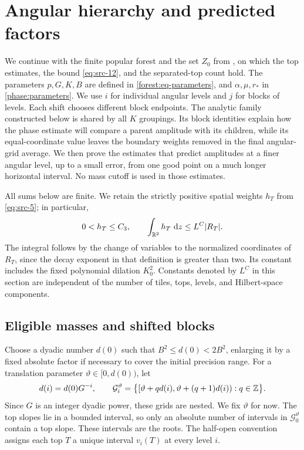 \section{Angular hierarchy and predicted factors}
\label{hier:section}

We continue with the finite popular forest and the set $Z_0$ from
, on which the top estimates, the bound
\eqref{eq:src-12}, and the separated-top count hold.  The parameters
$p,G,K,B$ are defined in \eqref{forest:eq-parameters}, and
$\alpha,\mu,r_*$ in \eqref{phase:parameters}.
We use $i$ for individual angular levels and $j$ for blocks of levels.
Each shift chooses different block endpoints.  The analytic family
constructed below is shared by all $K$ groupings.  Its block identities
explain how the phase estimate will compare a parent amplitude with its
children, while its equal-coordinate value leaves the boundary weights
removed in the final angular-grid average.  We then prove the estimates
that predict amplitudes at a finer angular level, up to a small error,
from one good point on a much longer horizontal interval.  No mass cutoff
is used in those estimates.

All sums below are finite.  We retain the strictly positive spatial
weights $h_T$ from \eqref{eq:src-5}; in particular,
\begin{equation}
 0<h_T\le C_3,
 \qquad
 \int_{\mathbb R^2}h_T\,\,\mathrm d z\le L^C |R_T|.
 \label{hier:top-weight-basic}
\end{equation}
The integral follows by the change of variables to the normalized
coordinates of $R_T$, since the decay exponent in that definition is
greater than two.  Its constant includes the fixed polynomial dilation
$K_0^2$.  Constants denoted by $L^C$ in this section are independent of the
number of tiles, tops, levels, and Hilbert-space components.

\subsection{Eligible masses and shifted blocks}

Choose a dyadic number $d(0)$ such that $B^2\le d(0)<2B^2$, enlarging it
by a fixed absolute factor if necessary to cover the initial precision
range.  For a translation parameter $\vartheta\in[0,d(0))$, let
\begin{equation}
 d(i)=d(0)G^{-i},
 \qquad
 \mathcal G_i^\vartheta
 =\bigl\{[\vartheta+q d(i),\vartheta+(q+1)d(i)):q\in\mathbb Z\bigr\}.
 \label{hier:angular-grid}
\end{equation}
Since $G$ is an integer dyadic power, these grids are nested.  We fix
$\vartheta$ for now.  The top slopes lie in a bounded interval, so only an
absolute number of intervals in $\mathcal G_0^\vartheta$ contain a top
slope.  These intervals are the roots.  The half-open convention assigns
each top $T$ a unique interval $v_i(T)$ at every level $i$.

